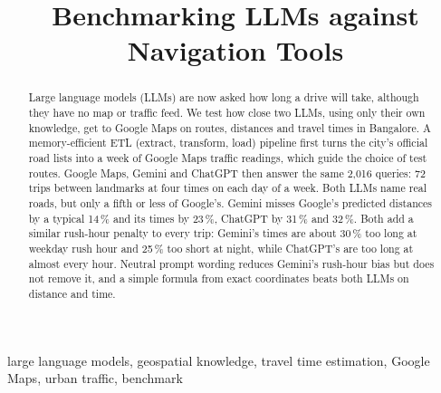 \documentclass[conference]{IEEEtran}
\begin{document}
\title{Benchmarking LLMs against Navigation Tools}

\author{
}

\maketitle

\begin{abstract}
Large language models (LLMs) are now asked how long a drive will take, although they have no map or traffic feed. We test how close two LLMs, using only their own knowledge, get to Google Maps on routes, distances and travel times in Bangalore. A memory-efficient ETL (extract, transform, load) pipeline first turns the city's official road lists into a week of Google Maps traffic readings, which guide the choice of test routes. Google Maps, Gemini and ChatGPT then answer the same 2,016 queries: 72 trips between landmarks at four times on each day of a week. Both LLMs name real roads, but only a fifth or less of Google's. Gemini misses Google's predicted distances by a typical 14\,\% and its times by 23\,\%, ChatGPT by 31\,\% and 32\,\%. Both add a similar rush-hour penalty to every trip: Gemini's times are about 30\,\% too long at weekday rush hour and 25\,\% too short at night, while ChatGPT's are too long at almost every hour. Neutral prompt wording reduces Gemini's rush-hour bias but does not remove it, and a simple formula from exact coordinates beats both LLMs on distance and time.
\end{abstract}

\begin{IEEEkeywords}
large language models, geospatial knowledge, travel time estimation, Google Maps, urban traffic, benchmark
\end{IEEEkeywords}

\end{document}
